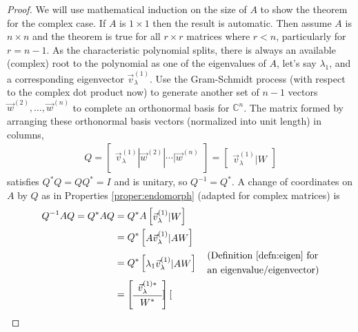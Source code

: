 \begin{proof}
We will use mathematical induction on the size of $A$ to show the theorem for the complex case. If $A$ is $1 \times 1$ then the result is automatic. Then assume $A$ is $n \times n$ and the theorem is true for all $r \times r$ matrices where $r < n$, particularly for $r = n-1$. As the characteristic polynomial splits, there is always an available (complex) root to the polynomial as one of the eigenvalues of $A$, let's say $\lambda_1$, and a corresponding eigenvector $\vec{v}_\lambda^{(1)}$. Use the Gram-Schmidt process (with respect to the complex dot product now) to generate another set of $n-1$ vectors $\vec{w}^{(2)}, \ldots, \vec{w}^{(n)}$ to complete an orthonormal basis for $\mathbb{C}^n$. The matrix formed by arranging these orthonormal basis vectors (normalized into unit length) in columns,
\begin{align*}
Q = \begin{bmatrix}
\vec{v}_\lambda^{(1)} | \vec{w}^{(2)} | \cdots | \vec{w}^{(n)}
\end{bmatrix} =
\begin{bmatrix}
\vec{v}_\lambda^{(1)} | W
\end{bmatrix}
\end{align*}
satisfies $Q^*Q = QQ^* = I$ and is unitary, so $Q^{-1} = Q^*$. A change of coordinates on $A$ by $Q$ as in Properties \ref{proper:endomorph} (adapted for complex matrices) is
\begin{align}
Q^{-1}AQ = Q^* AQ &= Q^*A\begin{bmatrix}
\vec{v}_\lambda^{(1)} | W
\end{bmatrix} \nonumber \\
&= Q^*\begin{bmatrix}
A\vec{v}_\lambda^{(1)} | AW
\end{bmatrix} \nonumber \\
&= Q^*\begin{bmatrix}
\lambda_1\vec{v}_\lambda^{(1)} | AW
\end{bmatrix} \quad \begin{aligned}
&\text{(Definition \ref{defn:eigen} for} \\
&\text{an eigenvalue/eigenvector)}
\end{aligned} \nonumber \\
&= 
\left[\begin{array}{c}
\vec{v}_\lambda^{(1)*} \Bstrut \\
\hline
W^* \Tstrut
\end{array}\right]
\begin{bmatrix}

\end{bmatrix}
\end{align}
\end{proof}
